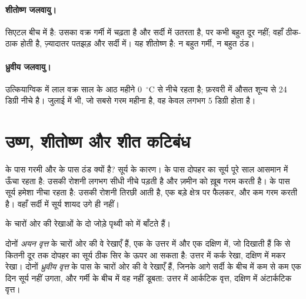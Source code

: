\paragraph{शीतोष्ण जलवायु।} सिएटल बीच में है: उसका वक्र गर्मी में चढ़ता है और सर्दी
में उतरता है, पर कभी बहुत दूर नहीं; वहाँ ठीक-ठाक  होती है, ज़्यादातर पतझड़
और सर्दी में। यह शीतोष्ण  है: न बहुत गर्मी,
न बहुत ठंड।

\paragraph{ध्रुवीय जलवायु।} उत्कियाग्विक में लाल वक्र साल के आठ महीने
0~$^\circ$C से नीचे रहता है; फ़रवरी में औसत शून्य से
24 डिग्री नीचे है। जुलाई में भी, जो सबसे गरम महीना है, वह केवल लगभग
5 डिग्री होता है।

\section{उष्ण, शीतोष्ण और शीत कटिबंध}

 के पास गरमी और  के पास ठंड क्यों है? सूर्य के कारण। 
के पास दोपहर का सूर्य पूरे साल आसमान में ऊँचा रहता है: उसकी रोशनी लगभग सीधी नीचे
पड़ती है और ज़मीन को ख़ूब गरम करती है।  के पास सूर्य हमेशा नीचा रहता है:
उसकी रोशनी तिरछी आती है, एक बड़े क्षेत्र पर फैलकर, और कम गरम करती है। वहाँ
सर्दी में सूर्य शायद
उगे ही नहीं।

 के चारों ओर की रेखाओं के दो जोड़े पृथ्वी को  में बाँटते हैं।

\begin{definition}[अयन वृत्त और ध्रुवीय वृत्त]\label{def:g5:weather-and-climate:tropics}
दोनों \emph{अयन वृत्त}  के चारों ओर की वे रेखाएँ हैं, एक
 के उत्तर में और एक दक्षिण में, जो दिखाती हैं कि  से कितनी
दूर तक दोपहर का सूर्य ठीक सिर के ऊपर आ सकता है: उत्तर में कर्क रेखा, दक्षिण में
मकर रेखा। दोनों \emph{ध्रुवीय
वृत्त}  के पास  के चारों ओर की वे रेखाएँ हैं,
जिनके आगे सर्दी के बीच में कम से कम एक दिन सूर्य नहीं उगता, और गर्मी के बीच में
वह नहीं डूबता: उत्तर में आर्कटिक
वृत्त, दक्षिण में अंटार्कटिक वृत्त।
\end{definition}

